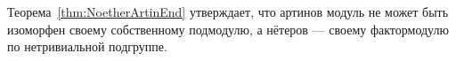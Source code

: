 \documentclass[
	extrafontsizes,
	11pt,
	hyphens,
]{memoir}
\begin{document}
\begin{remark}
Теорема~\ref{thm:NoetherArtinEnd} утверждает, что артинов модуль не может быть изоморфен своему собственному подмодулю, а нётеров
---
своему фактормодулю по нетривиальной подгруппе.
\end{remark}

%

%
%
%
\end{document}
